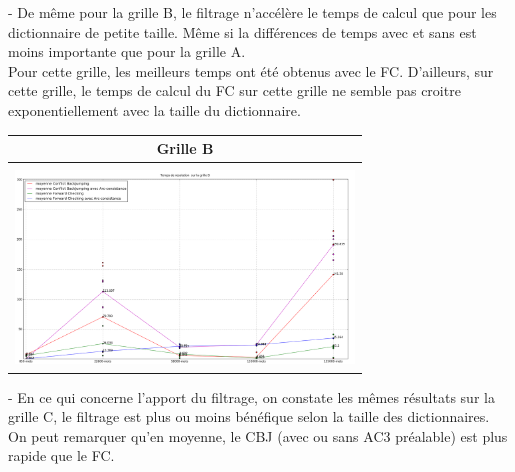 \documentclass[a4paper,12pt]{report}
\begin{document}
\begin{enumerate}
\begin{table}[!h]
\begin{center}
\begin{tabular}{|c|}
\end{tabular}
\end{center}
\end{table}

- De même pour la grille B, le filtrage n'accélère le temps de calcul que pour les dictionnaire de petite taille. Même si la différences de temps avec et sans est moins importante que pour la grille A.\\

Pour cette grille, les meilleurs temps ont été obtenus avec le FC. D'ailleurs, sur cette grille, le temps de calcul du FC sur cette grille ne semble pas croitre exponentiellement avec la taille du dictionnaire.\\

\begin{table}[!h]
\begin{center}
\begin{tabular}{|c|}

\hline
Grille B \\
\hline 
\\
\includegraphics[width=9cm]{Grille_B.png} \\
\hline


\end{tabular}
\end{center}
\end{table}
\newpage
- En ce qui concerne l'apport du filtrage, on constate les mêmes résultats sur la grille C, le filtrage est plus ou moins bénéfique selon la taille des dictionnaires. \\

On peut remarquer qu'en moyenne, le CBJ (avec ou sans AC3 préalable) est plus rapide que le FC.\\

\begin{table}[!h]
\begin{center}
\begin{tabular}{|c|}


\end{tabular}
\end{center}
\end{table}
\end{enumerate}
\end{document}
